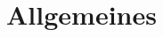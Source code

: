 



\subject{Vereinssatzung}
\title{\name}
\subtitle{Vereinssatzung für den \name}
\date{\today \\ \version}
\maketitle

\tableofcontents

\pagestyle{body}

\appendix

\section{Allgemeines}
